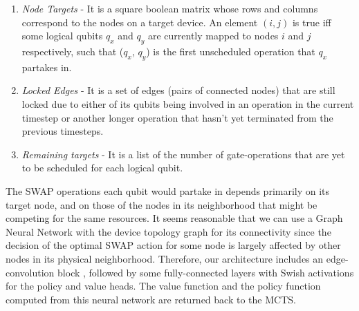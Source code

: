 \documentclass[%
 reprint,
amsmath,amssymb,showkeys,
pra,
]{revtex4-2}
\begin{document}
\begin{enumerate}[label=(\roman*)]
    \item \textit{Node Targets} - It is a square boolean matrix whose rows and columns correspond to the nodes on a target device. An element $(i, j)$ is true iff some logical qubits $q_x$ and $q_y$ are currently mapped to nodes $i$ and $j$ respectively, such that ($q_x$, $q_y$) is the first unscheduled operation that $q_x$ partakes in.
    \item \textit{Locked Edges} - It is a set of edges (pairs of connected nodes) that are still locked due to either of its qubits being involved in an operation in the current timestep or another longer operation that hasn't yet terminated from the previous timesteps.
    \item \textit{Remaining targets} - It is a list of the number of gate-operations that are yet to be scheduled for each logical qubit. 
\end{enumerate}


The SWAP operations each qubit would partake in depends primarily on its target node, and on those of the nodes in its neighborhood that might be competing for the same resources. It seems reasonable that we can use a Graph Neural Network with the device topology graph for its connectivity since the decision of the optimal SWAP action for some node is largely affected by other nodes in its physical neighborhood. Therefore, our architecture includes an edge-convolution block \citep{nn_edge_conv}, followed by some fully-connected layers with Swish \citep{nn_swish} activations for the policy and value heads. The value function and the policy function computed from this neural network are returned back to the MCTS.
\end{document}

